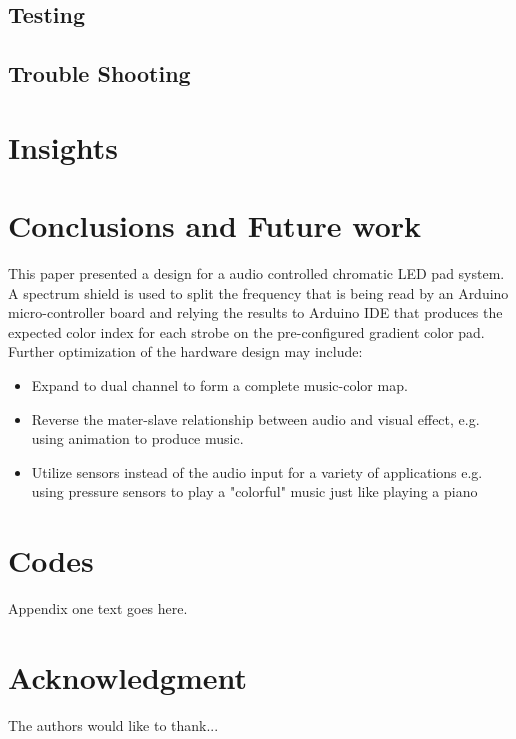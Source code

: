 \documentclass[12pt,a4paper,journal]{IEEEtran}
\begin{document}
\subsection{Testing}
\subsection{Trouble Shooting}
\section{Insights}

\section{Conclusions and Future work}
This paper presented a design for a audio controlled chromatic LED pad system. A spectrum shield is used to split the frequency that is being read by an Arduino micro-controller board and relying the results to Arduino IDE that produces the expected color index for each strobe on the pre-configured gradient color pad.
Further optimization of the hardware design may include: 
\begin{itemize}
\item Expand to dual channel to form a complete music-color map. 
\item Reverse the mater-slave relationship between audio and visual effect, e.g. using animation to produce music.
\item Utilize sensors instead of the audio input for a variety of applications e.g. using pressure sensors to play a "colorful" music just like playing a piano
\end{itemize}


\appendices
\section{Codes}
Appendix one text goes here.

\section*{Acknowledgment}


The authors would like to thank...


\ifCLASSOPTIONcaptionsoff
  \newpage
\fi

\end{document}
